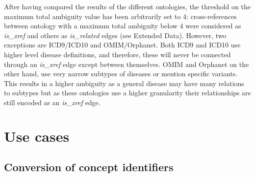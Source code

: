 \documentclass[9pt,a4paper,]{extarticle}
\begin{document}
After having compared the results of the different ontologies, the threshold on the maximum total ambiguity value has been arbitrarily set to 4: cross-references between ontology with a maximum total ambiguity below 4 were considered as \emph{is\_xref} and others as \emph{is\_related} edges (see Extended Data). However, two exceptions are ICD9/ICD10 and OMIM/Orphanet. Both ICD9 and ICD10 use higher level disease definitions, and therefore, these will never be connected through an \emph{is\_xref} edge except between themselves. OMIM and Orphanet on the other hand, use very narrow subtypes of diseases or mention specific variants. This results in a higher ambiguity as a general disease may have many relations to subtypes but as these ontologies use a higher granularity their relationships are still encoded as an \emph{is\_xref} edge.

\hypertarget{use-cases}{%
\section{Use cases}\label{use-cases}}

\hypertarget{conversion-of-concept-identifiers}{%
\subsection{Conversion of concept identifiers}\label{conversion-of-concept-identifiers}}
\end{document}
